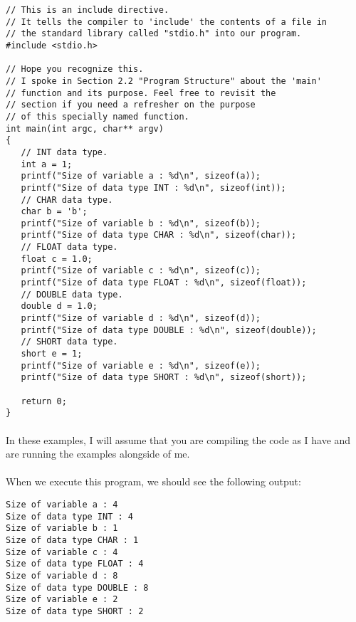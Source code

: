 \newpage

\begin{lstlisting}
// This is an include directive.
// It tells the compiler to 'include' the contents of a file in 
// the standard library called "stdio.h" into our program.
#include <stdio.h>

// Hope you recognize this.
// I spoke in Section 2.2 "Program Structure" about the 'main' 
// function and its purpose. Feel free to revisit the 
// section if you need a refresher on the purpose
// of this specially named function.
int main(int argc, char** argv)
{
   // INT data type.
   int a = 1;
   printf("Size of variable a : %d\n", sizeof(a));
   printf("Size of data type INT : %d\n", sizeof(int));
   // CHAR data type.
   char b = 'b';
   printf("Size of variable b : %d\n", sizeof(b));
   printf("Size of data type CHAR : %d\n", sizeof(char));
   // FLOAT data type.
   float c = 1.0;
   printf("Size of variable c : %d\n", sizeof(c));
   printf("Size of data type FLOAT : %d\n", sizeof(float));
   // DOUBLE data type.
   double d = 1.0;
   printf("Size of variable d : %d\n", sizeof(d));
   printf("Size of data type DOUBLE : %d\n", sizeof(double));
   // SHORT data type.
   short e = 1;
   printf("Size of variable e : %d\n", sizeof(e));
   printf("Size of data type SHORT : %d\n", sizeof(short));

   return 0;
}
\end{lstlisting}

\paragraph{}
   In these examples, I will assume that you are compiling the code as I have and are running the examples alongside of me.

\paragraph{}
   When we execute this program, we should see the following output:

\begin{lstlisting}
Size of variable a : 4
Size of data type INT : 4
Size of variable b : 1
Size of data type CHAR : 1
Size of variable c : 4
Size of data type FLOAT : 4
Size of variable d : 8
Size of data type DOUBLE : 8
Size of variable e : 2
Size of data type SHORT : 2
\end{lstlisting}

